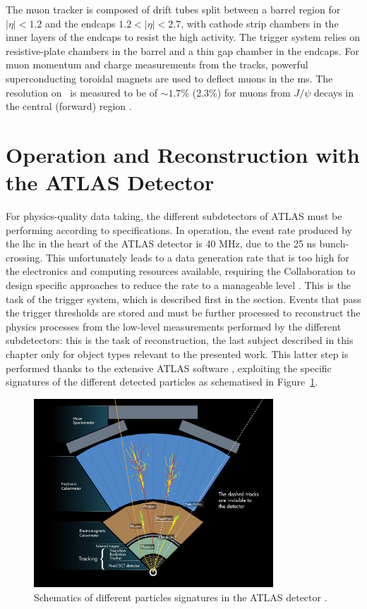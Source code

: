 The muon tracker is composed of drift tubes split between a barrel region for $|\eta| < 1.2$ and the endcaps $1.2 < |\eta| < 2.7$, with cathode strip chambers in the inner layers of the endcaps to resist the high activity. The trigger system relies on resistive-plate chambers in the barrel and a thin gap chamber in the endcaps. For muon momentum and charge measurements from the tracks, powerful superconducting toroidal magnets are used to deflect muons in the \gls{ms}. The resolution on \pt\ is measured to be of $\sim 1.7$\% (2.3\%) for muons from $J/\psi$ decays in the central (forward) region \cite{atlasMuonPTReco}.

\section{Operation and Reconstruction with the ATLAS Detector}
For physics-quality data taking, the different subdetectors of ATLAS must be performing according to specifications. In operation, the event rate produced by the \gls{lhc} in the heart of the ATLAS detector is 40 MHz, due to the 25 ns bunch-crossing. This unfortunately leads to a data generation rate that is too high for the electronics and computing resources available, requiring the Collaboration to design specific approaches to reduce the rate to a manageable level \cite{Nedden_2017}. This is the task of the trigger system, which is described first in the section. Events that pass the trigger thresholds are stored and must be further processed to reconstruct the physics processes from the low-level measurements performed by the different subdetectors: this is the task of reconstruction, the last subject described in this chapter only for object types relevant to the presented work. This latter step is performed thanks to the extensive ATLAS software \cite{ATL-SOFT-PUB-2021-001, ATL-SOFT-PUB-2020-001}, exploiting the specific signatures of the different detected particles as schematised in Figure~\ref{fig-ATLASdetect}.

\begin{figure}[!h]
  \centering
  \includegraphics[width=0.8\textwidth]{Images/ATLAS/ATLASdetection.jpg}
  \caption{Schematics of different particles signatures in the ATLAS detector \cite{Pequenao:1505342}.}
  \label{fig-ATLASdetect}
\end{figure}

